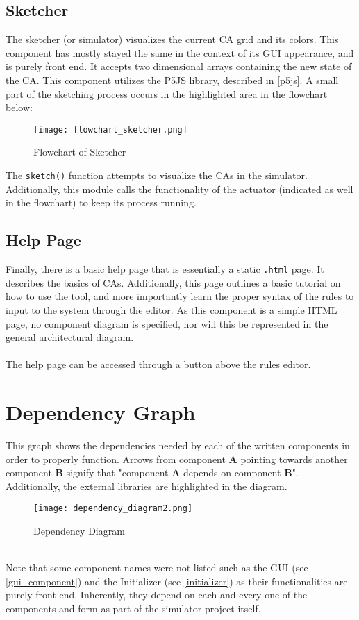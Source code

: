 \subsection{Sketcher}
The sketcher (or simulator) visualizes the current CA grid and its colors. This component has mostly stayed the same in the context of its GUI appearance, and is purely front end. It accepts two dimensional arrays containing the new state of the CA. This component utilizes the P5JS library, described in \ref{p5js}. A small part of the sketching process occurs in the highlighted area in the flowchart below:
\\
\begin{figure}[H]
    \caption{Flowchart of Sketcher}
    \centering
    \texttt{[image: flowchart\_sketcher.png]}
\end{figure}
\noindent The \texttt{sketch()} function attempts to visualize the CAs in the simulator. Additionally, this module calls the functionality of the actuator (indicated as well in the flowchart) to keep its process running.

\subsection{Help Page}
Finally, there is a basic help page that is essentially a static \texttt{.html} page. It describes the basics of CAs. Additionally, this page outlines a basic tutorial on how to use the tool, and more importantly learn the proper syntax of the rules to input to the system through the editor. As this component is a simple HTML page, no component diagram is specified, nor will this be represented in the general architectural diagram. 
\\ \\
The help page can be accessed through a button above the rules editor.
\newpage
\section{Dependency Graph}
This graph shows the dependencies needed by each of the written components in order to properly function. Arrows from component \textbf{A} pointing towards another component \textbf{B} signify that "component \textbf{A} depends on component \textbf{B}". Additionally, the external libraries are highlighted in the diagram.
\\
\begin{figure}[h]
    \caption{Dependency Diagram}
    \centering
    \texttt{[image: dependency\_diagram2.png]}
\end{figure}
\\
Note that some component names were not listed such as the GUI (see \ref{gui_component}) and the Initializer (see \ref{initializer}) as their functionalities are purely front end. Inherently, they depend on each and every one of the components and form as part of the simulator project itself. 